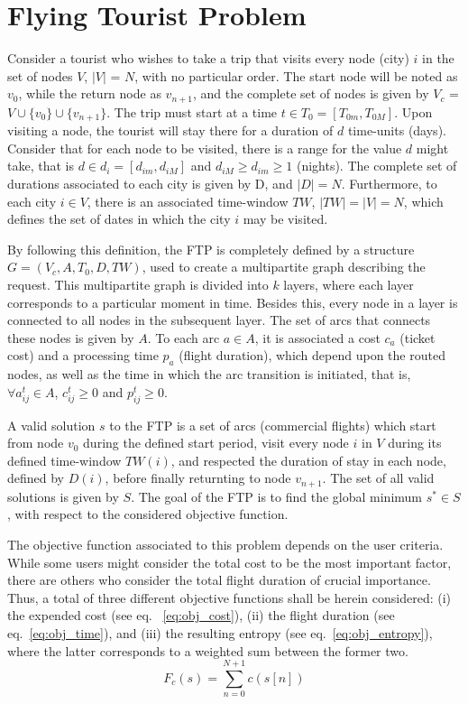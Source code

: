 \section{Flying Tourist Problem}
\label{sec:ftp}


Consider a tourist who wishes to take a trip that visits every node (city) $i$
in the set of nodes $V$, $|V|$ = $N$, with no particular order. The start node
will be noted as $v_{0}$, while the return node as $v_{n+1}$, and the complete
set of nodes is given by $V_c$ = $V \cup \{v_0\} \cup \{v_{n+1}\}$. The trip
must start at a time $t \in T_0 = [T_{0m}, T_{0M}]$. Upon visiting a node, the
tourist will stay there for a duration of $d$ time-units (days). Consider that
for each node to be visited, there is a range for the value $d$ might take, that
is $d \in d_i = [d_{im}, d_{iM}]$ and $d_{iM} \geq d_{im} \geq 1$ (nights). The complete
set of durations associated to each city is given by D, and $|D| = N$.
Furthermore, to each city $i \in V$, there is an associated time-window $TW$,
$|TW| = |V| = N$, which defines the set of dates in which the city $i$ may be
visited.

By following this definition, the FTP is completely defined by a structure $G =
(V_c, A, T_{0}, D, TW)$, used to create a multipartite graph describing the
request. This multipartite graph is divided into $k$ layers, where each layer
corresponds to a particular moment in time. Besides this, every node in a layer
is connected to all nodes in the subsequent layer. The set of arcs that connects
these nodes is given by $A$. To each arc $a \in A$, it is associated a cost
$c_{a}$ (ticket cost) and a processing time $p_{a}$ (flight duration), which
depend upon the routed nodes, as well as the time in which the arc transition is
initiated, that is, $\forall a_{ij}^{t} \in A$, $c_{ij}^{t} \geq 0$ and
$p_{ij}^{t} \geq 0$.

A valid solution $s$ to the FTP is a set of arcs (commercial flights)
which start from node $v_0$ during the defined start period, visit every node
$i$ in $V$ during its defined time-window $TW(i)$, and respected the duration of stay in each node, defined by $D(i)$, before finally returnting to node $v_{n+1}$. The set of
all valid solutions is given by $S$. The goal of the FTP is to find the global
minimum $s^* \in S$, with respect to the considered objective function.

The objective function associated to this problem depends on the user criteria.
While some users might consider the total cost to be the most important
factor, there are others who consider the total flight duration of crucial
importance. Thus, a total of three different objective functions shall be herein
considered: (i) the expended cost (see eq. ~\ref{eq:obj_cost}), (ii) the flight
duration (see eq.~\ref{eq:obj_time}), and (iii) the resulting entropy (see
eq.~\ref{eq:obj_entropy}), where the latter corresponds to a weighted sum
between the former two. 
\begin{equation}
\label{eq:obj_cost}
  F_{c}(s) = \sum_{n=0}^{N+1} c(s[n])
\end{equation}

